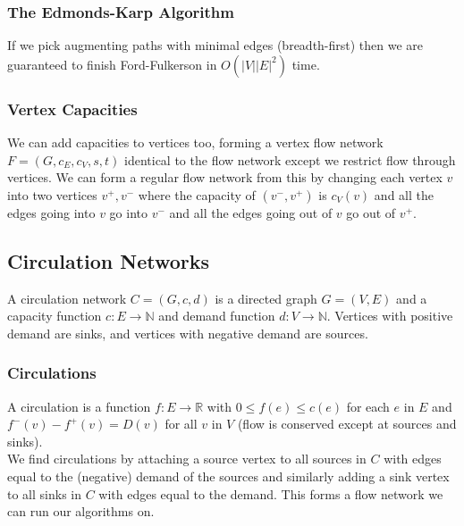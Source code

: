 \subsubsection{The Edmonds-Karp Algorithm}

If we pick augmenting paths with minimal edges (breadth-first) then we are guaranteed to 
finish Ford-Fulkerson in $O(|V||E|^2)$ time.

\subsubsection{Vertex Capacities}

We can add capacities to vertices too, forming a vertex flow network 
$F = (G, c_E, c_V, s, t)$ identical to the flow network except we restrict flow through
vertices. We can form a regular flow network from this by changing each vertex $v$
into two vertices $v^+, v^-$ where the capacity of $(v^-, v^+)$ is $c_V(v)$ and
all the edges going into $v$ go into $v^-$ and all the edges going
out of $v$ go out of $v^+$.

\subsection{Circulation Networks}

A circulation network $C = (G, c, d)$ is a directed graph $G = (V, E)$ and a
capacity function $c : E \to \mathbb{N}$ and demand function $d : V \to \mathbb{N}$.
Vertices with positive demand are sinks, and vertices with negative demand are sources.

\subsubsection{Circulations}

A circulation is a function $f : E \to \mathbb{R}$ with $0 \leq f(e) \leq c(e)$ for each
$e$ in $E$ and $f^-(v) - f^+(v) = D(v)$ for all $v$ in $V$ (flow is conserved except at
sources and sinks).
\\[\baselineskip]
We find circulations by attaching a source vertex to all sources in $C$ with edges equal
to the (negative) demand of the sources and similarly adding a sink vertex to all
sinks in $C$ with edges equal to the demand. This forms a flow network we can run our 
algorithms on.